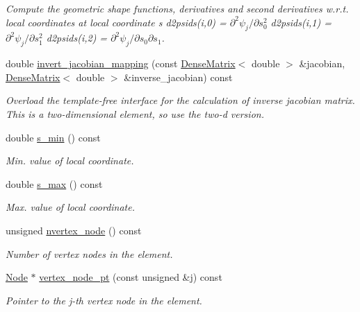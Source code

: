 \begin{DoxyCompactItemize}
\begin{DoxyCompactList}\small\item\em Compute the geometric shape functions, derivatives and second derivatives w.\+r.\+t. local coordinates at local coordinate s d2psids(i,0) = $ \partial^2 \psi_j / \partial s_0^2 $ d2psids(i,1) = $ \partial^2 \psi_j / \partial s_1^2 $ d2psids(i,2) = $ \partial^2 \psi_j / \partial s_0 \partial s_1 $. \end{DoxyCompactList}\item 
double \hyperlink{classoomph_1_1QElement_3_012_00_01NNODE__1D_01_4_a535ca15e3fca609458bd51347e86e9a5}{invert\+\_\+jacobian\+\_\+mapping} (const \hyperlink{classoomph_1_1DenseMatrix}{Dense\+Matrix}$<$ double $>$ \&jacobian, \hyperlink{classoomph_1_1DenseMatrix}{Dense\+Matrix}$<$ double $>$ \&inverse\+\_\+jacobian) const
\begin{DoxyCompactList}\small\item\em Overload the template-\/free interface for the calculation of inverse jacobian matrix. This is a two-\/dimensional element, so use the two-\/d version. \end{DoxyCompactList}\item 
double \hyperlink{classoomph_1_1QElement_3_012_00_01NNODE__1D_01_4_a070d33ed7c9b0b224461b222a8214a99}{s\+\_\+min} () const
\begin{DoxyCompactList}\small\item\em Min. value of local coordinate. \end{DoxyCompactList}\item 
double \hyperlink{classoomph_1_1QElement_3_012_00_01NNODE__1D_01_4_ad14a113b809f3b407c63f6690ebc6c6d}{s\+\_\+max} () const
\begin{DoxyCompactList}\small\item\em Max. value of local coordinate. \end{DoxyCompactList}\item 
unsigned \hyperlink{classoomph_1_1QElement_3_012_00_01NNODE__1D_01_4_a6f0b16e49ea89943992de42be44a2786}{nvertex\+\_\+node} () const
\begin{DoxyCompactList}\small\item\em Number of vertex nodes in the element. \end{DoxyCompactList}\item 
\hyperlink{classoomph_1_1Node}{Node} $\ast$ \hyperlink{classoomph_1_1QElement_3_012_00_01NNODE__1D_01_4_a9d25598f1028fbd881dd5c57fea03d83}{vertex\+\_\+node\+\_\+pt} (const unsigned \&j) const
\begin{DoxyCompactList}\small\item\em Pointer to the j-\/th vertex node in the element. \end{DoxyCompactList}\item 

\end{DoxyCompactItemize}
